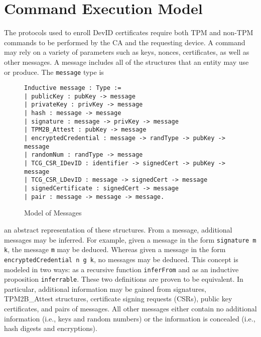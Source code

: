 
\chapter{Command Execution Model}






The protocols used to enroll DevID certificates require both TPM and non-TPM commands to be performed by the CA and the requesting device. A command may rely on a variety of parameters such as keys, nonces, certificates, as well as other messages. A message includes all of the structures that an entity may use or produce. The \verb|message| type is 
\begin{figure}[h]
\begin{lstlisting}[language=Coq]
Inductive message : Type :=
| publicKey : pubKey -> message
| privateKey : privKey -> message
| hash : message -> message
| signature : message -> privKey -> message
| TPM2B_Attest : pubKey -> message
| encryptedCredential : message -> randType -> pubKey -> message
| randomNum : randType -> message
| TCG_CSR_IDevID : identifier -> signedCert -> pubKey -> message
| TCG_CSR_LDevID : message -> signedCert -> message
| signedCertificate : signedCert -> message
| pair : message -> message -> message.
\end{lstlisting}
\caption{Model of Messages}
\end{figure}
an abstract representation of these structures. From a message, additional messages may be inferred. For example, given a message in the form \verb|signature m k|, the message \verb|m| may be deduced. Whereas given a message in the form \verb|encryptedCredential n g k|, no messages may be deduced. This concept is modeled in two ways: as a recursive function \verb|inferFrom| and as an inductive proposition \verb|inferrable|. These two definitions are proven to be equivalent. In particular, additional information may be gained from signatures, TPM2B\_Attest structures, certificate signing requests (CSRs), public key certificates, and pairs of messages. All other messages either contain no additional information (i.e., keys and random numbers) or the information is concealed (i.e., hash digests and encryptions). 



